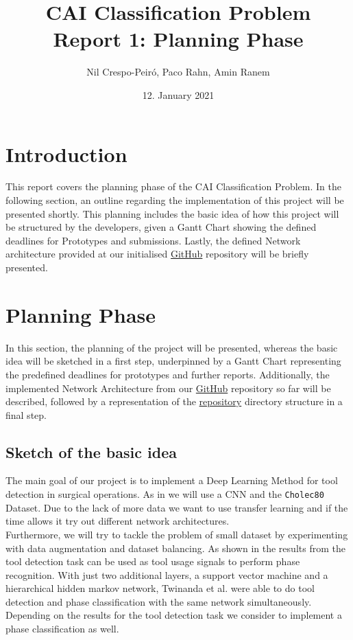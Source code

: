\documentclass{article}
\title{CAI Classification Problem\\Report 1: Planning Phase}
\author{Nil Crespo-Peiró, Paco Rahn, Amin Ranem}
\date{12. January 2021}
\begin{document}
\maketitle

\section{Introduction}
This report covers the planning phase of the CAI Classification Problem. In the following section, an outline regarding the implementation of this project will be presented shortly. This planning includes the basic idea of how this project will be structured by the developers, given a Gantt Chart showing the defined deadlines for Prototypes and submissions. Lastly, the defined Network architecture provided at our initialised \href{https://github.com/amrane99/CAI-Classification/tree/main}{GitHub} repository will be briefly presented.

\section{Planning Phase}
In this section, the planning of the project will be presented, whereas the basic idea will be sketched in a first step, underpinned by a Gantt Chart representing the predefined deadlines for prototypes and further reports. Additionally, the implemented Network Architecture from our \href{https://github.com/amrane99/CAI-Classification/tree/main}{GitHub} repository so far will be described, followed by a representation of the \href{https://github.com/amrane99/CAI-Classification/tree/main}{repository}  directory structure in a final step.

\subsection{Sketch of the basic idea}
The main goal of our project is to implement a Deep Learning Method for tool detection in surgical operations. As in \cite{EndoNet} we will use a CNN and the \texttt{Cholec80} Dataset. Due to the lack of more data we want to use transfer learning and if the time allows it try out different network architectures. \\
\noindent
Furthermore, we will try to tackle the problem of small dataset by experimenting with data augmentation and dataset balancing.
As shown in \cite{EndoNet} the results from the tool detection task can be used as tool usage signals to perform phase recognition. With just two additional layers, a support vector machine and a hierarchical hidden markov network, Twinanda et al. were able to do tool detection and phase classification with the same network simultaneously. Depending on the results for the tool detection task we  consider to implement a phase classification as well.
\end{document}
